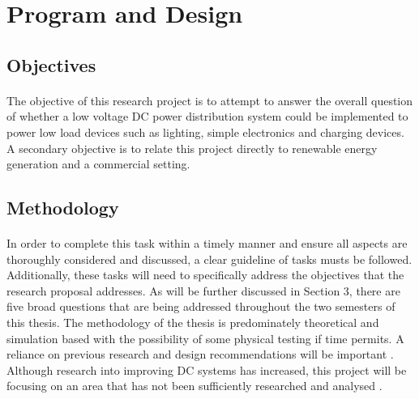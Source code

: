 \section{Program and Design}  


\subsection{Objectives}

\paragraph{}
The objective of this research project is to attempt to answer the overall question of whether a low voltage DC power distribution system could be implemented to power low load devices such as lighting, simple electronics and charging devices. A secondary objective is to relate this project directly to renewable energy generation and a commercial setting.

\subsection{Methodology}

\paragraph{}
In order to complete this task within a timely manner and ensure all aspects are thoroughly considered and discussed, a clear guideline of tasks musts be followed. Additionally, these tasks will need to specifically address the objectives that the research proposal addresses. As will be further discussed in Section 3, there are five broad questions that are being addressed throughout the two semesters of this thesis. The methodology of the thesis is predominately theoretical and simulation based with the possibility of some physical testing if time permits. A reliance on previous research and design recommendations will be important \cite{Amin2011}. Although research into improving DC systems has increased, this project will be focusing on an area that has not been sufficiently researched and analysed \cite{Pellis1997}.   

